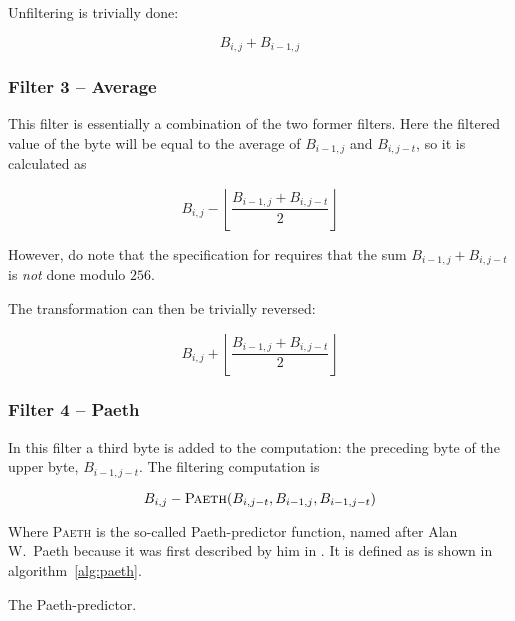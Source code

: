 Unfiltering is trivially done:

\begin{equation*}
  B_{i,j} + B_{i-1,j}
\end{equation*}

\subsubsection{Filter 3 -- Average}

This filter is essentially a combination of the two former
filters. Here the filtered value of the byte will be equal to the
average of $B_{i-1,j}$ and $B_{i,j-t}$, so it is calculated as

\begin{equation*}
  B_{i,j} - \left \lfloor \frac{B_{i-1,j} +
      B_{i,j-t}}{2} \right \rfloor
\end{equation*}

However, do note that the \png specification for requires that the sum
$B_{i-1,j} + B_{i,j-t}$ is \textit{not} done modulo $256$.

The transformation can then be trivially reversed:

\begin{equation*}
  B_{i,j} + \left \lfloor \frac{B_{i-1,j} +
      B_{i,j-t}}{2} \right \rfloor
\end{equation*}

\subsubsection{Filter 4 -- Paeth}

In this filter a third byte is added to the computation: the preceding
byte of the upper byte, $B_{i-1,j-t}$. The filtering computation is

\begin{equation*}
  B_{i,j} - \textsc{Paeth}(B_{i,j-t},B_{i-1,j},B_{i-1,j-t})
\end{equation*}

Where \textsc{Paeth} is the so-called Paeth-predictor function, named
after Alan W.~Paeth because it was first described by him in
\cite{arvo1994graphics_gems}. It is defined as is shown in
algorithm~\ref{alg:paeth}.


\begin{algorithm}[H]
  \caption{The Paeth-predictor.}
  \label{alg:paeth}
  \begin{algorithmic}[1]
    \State {}
    \State {}
    \Else
    \State {}
    \EndIf
    \EndProcedure
  \end{algorithmic}
\end{algorithm}


